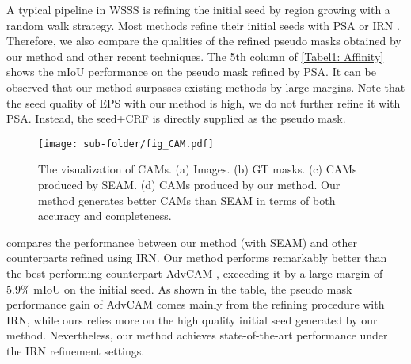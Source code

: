\documentclass[10pt,twocolumn,letterpaper]{article}
\begin{document}
A typical pipeline in WSSS is refining the initial seed by region growing with a random walk strategy.
Most methods refine their initial seeds with PSA \cite{ahn2018learningAffinityNet} or IRN \cite{ahn2019weaklyIRNet}.
Therefore, we also compare the qualities of the refined pseudo masks obtained by our method and other recent techniques. 
The 5th column of \cref{Tabel1: Affinity} shows the mIoU performance on the pseudo mask refined by PSA.
It can be observed that our method surpasses existing methods by large margins. Note that the seed quality of EPS with our method is high, we do not further refine it with PSA. Instead, the seed+CRF is directly supplied as the pseudo mask.

\begin{figure}[t]
\centering
\begin{center}
\texttt{[image: sub-folder/fig\_CAM.pdf]}
\end{center}
\caption{The visualization of CAMs. (a) Images. (b) GT masks. (c) CAMs produced by SEAM. (d) CAMs produced by our method. Our method generates better CAMs than SEAM in terms of both accuracy and completeness.}
\label{fig:CAM}
\end{figure}

 compares the performance between our method (with SEAM) and other counterparts refined using IRN.
Our method performs remarkably better than the best performing counterpart AdvCAM \cite{lee2021antiADVCAM}, exceeding it by a large margin of $5.9\%$ mIoU on the initial seed. As shown in the table, the pseudo mask performance gain of AdvCAM comes mainly from the refining procedure with IRN, while ours relies more on the high quality initial seed generated by our method.
Nevertheless, our method achieves state-of-the-art performance under the IRN refinement settings.
\end{document}
